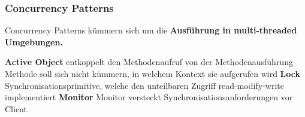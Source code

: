 \columnbreak

\subsubsection{Concurrency Patterns}

Concurrency Patterns kümmern sich um die \textbf{Ausführung in multi-threaded Umgebungen.}

\vspace{0.1cm}


    

\begin{outline}
    \1 \textbf{Active Object}
        \2 entkoppelt den Methodenaufruf von der Methodenausführung \\
            Methode soll sich nicht kümmern, in welchem Kontext sie aufgerufen wird
    \1 \textbf{Lock}
        \2 Synchronisationsprimitive, welche den unteilbaren Zugriff read-modify-write implementiert
    \1 \textbf{Monitor}
        \2 Monitor versteckt Synchronisationsanforderungen vor Client
\end{outline}

